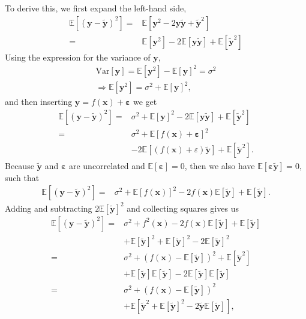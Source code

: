 \documentclass[a4paper, 10pt]{article}
\begin{document}
\begin{multicols}{2}
To derive this, we first expand the left-hand side,
\begin{align*}
\mathbb{E}[	(\bm{y}-\bm{\tilde{y}})^2] =& \mathbb{E}[\bm{y}^2  -2\bm{y}\bm{\tilde{y}}+ \bm { \tilde{y} } ^2 ] \\
=& \mathbb{E}[\bm{y}^2]  - 2\mathbb{E}[\bm{y\tilde{y}}]+\mathbb{E}[\bm{\tilde{y}}^2]
\end{align*}
Using the expression for the variance of $\bm{y}$,
\begin{align}
\text{Var}[\bm{y}] = \mathbb{E}[\bm{y}^2] - \mathbb{E}[{\bm{y}}]^2 = \sigma^2\\
\Rightarrow \mathbb{E}[\bm{y}^2] = \sigma^2 + \mathbb{E}[{\bm{y}}]^2,
\end{align}
 and then inserting $\bm{y} = f(\bm{x}) + \bm{\varepsilon}$ we get
\begin{align*}
\mathbb{E}[	(\bm{y}-\bm{\tilde{y}})^2]=& \sigma^2 +  \mathbb{E}[\bm{y}]^2  -2 \mathbb{E}[\bm{y}\bm{\tilde{y}}] +  \mathbb{E}[\bm{\tilde{y}}^2]\\
=& \sigma^2 +  \mathbb{E}[f(\bm{x}) + \bm{\varepsilon}]^2 \\&- 2 \mathbb{E} [(f(\bm{x})+\varepsilon)\bm{\tilde{y}}] +  \mathbb{E}[\bm{\tilde{y}}^2 ].
\end{align*}
Because  $\bm{\tilde{y}}$ and $\bm{\varepsilon}$ are uncorrelated and $\mathbb{E}[\bm{\varepsilon}]=0$, then we also have $\mathbb{E}[\bm{\varepsilon\tilde{y}}]=0,$ such that
\begin{align*}
\mathbb{E}[	(\bm{y}-\bm{\tilde{y}})^2]=& \sigma^2 +  \mathbb{E}[f(\bm{x})]^2 -2f(\bm{x}) \mathbb{E}[\bm{\tilde{y}}] +  \mathbb{E}[\bm{\tilde{y}}].
\end{align*}
Adding and subtracting $2\mathbb{E}[\bm{\tilde{y}}]^2$ and collecting squares gives us
\begin{align*}
\mathbb{E}[	(\bm{y}-\bm{\tilde{y}})^2]=&\sigma^2 + f^2(\bm{x})-2f(\bm{x}) \mathbb{E}[\bm{\tilde{y}}] +  \mathbb{E}[\bm{\tilde{y}}]\\&+\mathbb{E}[\bm{\tilde{y}}]^2 + \mathbb{E}[\bm{\tilde{y}}]^2 -2\mathbb{E}[\bm{\tilde{y}}]^2\\
=&  \sigma ^2  + ( f(\bm{x}) -\mathbb{E}[\bm{\tilde{y}}]  )^2 + \mathbb{E}[\bm{\tilde{y}}^2] \\&+\mathbb{E}[\bm{\tilde{y}}]\mathbb{E}[\bm{\tilde{y}}]  - 2\mathbb{E}[\bm{\tilde{y}}]\mathbb{E}[\bm{\tilde{y}}]\\
= &  \sigma^2 +  ( f(\bm{x}) -\mathbb{E}[\bm{\tilde{y}}]  )^2   \\&+ \mathbb{E}[\bm{\tilde{y}}^2 + \mathbb{E}[\bm{\tilde{y}}]^2 - 2\bm{\tilde{y}}\mathbb{E}[\bm{\tilde{y}}]],

\end{align*}
\end{multicols}
\end{document}
